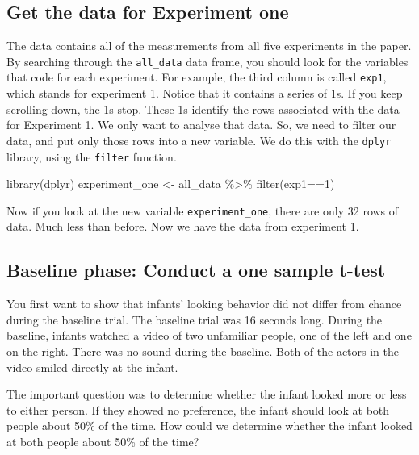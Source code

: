 \documentclass[
]{book}
\newenvironment{Shaded}{\begin{snugshade}}{\end{snugshade}}
\newcommand{\DecValTok}[1]{\textcolor[rgb]{0.00,0.00,0.81}{#1}}
\newcommand{\FunctionTok}[1]{\textcolor[rgb]{0.00,0.00,0.00}{#1}}
\newcommand{\NormalTok}[1]{#1}
\newcommand{\OtherTok}[1]{\textcolor[rgb]{0.56,0.35,0.01}{#1}}
\newcommand{\SpecialCharTok}[1]{\textcolor[rgb]{0.00,0.00,0.00}{#1}}
\begin{document}
\hypertarget{get-the-data-for-experiment-one}{%
\subsection{Get the data for Experiment one}\label{get-the-data-for-experiment-one}}

The data contains all of the measurements from all five experiments in the paper. By searching through the \texttt{all\_data} data frame, you should look for the variables that code for each experiment. For example, the third column is called \texttt{exp1}, which stands for experiment 1. Notice that it contains a series of 1s. If you keep scrolling down, the 1s stop. These 1s identify the rows associated with the data for Experiment 1. We only want to analyse that data. So, we need to filter our data, and put only those rows into a new variable. We do this with the \texttt{dplyr} library, using the \texttt{filter} function.

\begin{Shaded}
\begin{Highlighting}[]
\FunctionTok{library}\NormalTok{(dplyr)}
\NormalTok{experiment\_one }\OtherTok{\textless{}{-}}\NormalTok{ all\_data }\SpecialCharTok{\%\textgreater{}\%} \FunctionTok{filter}\NormalTok{(exp1}\SpecialCharTok{==}\DecValTok{1}\NormalTok{)}
\end{Highlighting}
\end{Shaded}

Now if you look at the new variable \texttt{experiment\_one}, there are only 32 rows of data. Much less than before. Now we have the data from experiment 1.

\hypertarget{baseline-phase-conduct-a-one-sample-t-test}{%
\subsection{Baseline phase: Conduct a one sample t-test}\label{baseline-phase-conduct-a-one-sample-t-test}}

You first want to show that infants' looking behavior did not differ from chance during the baseline trial. The baseline trial was 16 seconds long. During the baseline, infants watched a video of two unfamiliar people, one of the left and one on the right. There was no sound during the baseline. Both of the actors in the video smiled directly at the infant.

The important question was to determine whether the infant looked more or less to either person. If they showed no preference, the infant should look at both people about 50\% of the time. How could we determine whether the infant looked at both people about 50\% of the time?
\end{document}
